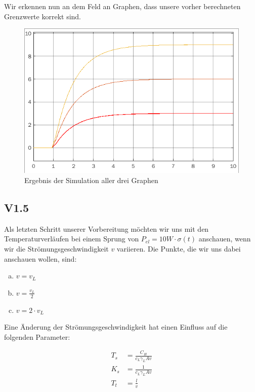 \documentclass{report}
\begin{document}
Wir erkennen nun an dem Feld an Graphen, dass unsere vorher berechneten Grenzwerte korrekt sind.

\begin{figure}[h]
  \centering
  \includegraphics[width=\textwidth]{../assets/images/RTP/rtp_1_V14.png}
  \caption{Ergebnis der Simulation aller drei Graphen}
  \label{fig:rtp1v14_2}
\end{figure}

\newpage

\subsection{V1.5}

Als letzten Schritt unserer Vorbereitung möchten wir uns mit den Temperaturverläufen bei einem Sprung von $P_{el} = 10W\cdot \sigma(t)$ anschauen, wenn wir die Strömungsgeschwindigkeit $v$ variieren. Die Punkte, die wir uns dabei anschauen wollen, sind:

\begin{enumerate}[a)]
   \item $v = v_{L}$
   \item $v = \frac{v_{L}}{2}$
   \item $v = 2 \cdot v_{L}$
\end{enumerate}

Eine Änderung der Strömungsgeschwindigkeit hat einen Einfluss auf die folgenden Parameter:

\begin{align*}
  \label{eq:10}
  T_{s} &= \frac{C_{H}}{c_{L}\gamma_{L}Av}\\
  K_{s} &= \frac{1}{c_{L}\gamma_{L}Av}\\
  T_{t} &= \frac{l}{v}
\end{align*}
\end{document}
